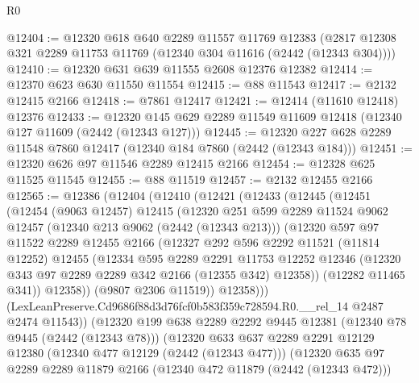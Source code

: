 \begin{lexlean}{R0}
\begin{coremodule}
@12404 := @12320
    @618
    @640
    @2289
    @11557
    @11769
    @12383
    (@2817 @12308 @321 @2289 @11753 @11769 (@12340 @304 @11616 (@2442 (@12343 @304))))
@12410 := @12320 @631 @639 @11555 @2608 @12376 @12382
@12414 := @12370 @623 @630 @11550 @11554
@12415 := @88 @11543
@12417 := @2132 @12415 @2166
@12418 := @7861 @12417
@12421 := @12414 (@11610 @12418) @12376
@12433 := @12320 @145 @629 @2289 @11549 @11609 @12418 (@12340 @127 @11609 (@2442 (@12343 @127)))
@12445 := @12320 @227 @628 @2289 @11548 @7860 @12417 (@12340 @184 @7860 (@2442 (@12343 @184)))
@12451 := @12320 @626 @97 @11546 @2289 @12415 @2166
@12454 := @12328 @625 @11525 @11545
@12455 := @88 @11519
@12457 := @2132 @12455 @2166
@12565 := @12386
    (@12404
      (@12410
        (@12421
          (@12433
            (@12445
              (@12451
                (@12454
                  (@9063 @12457)
                  @12415
                  (@12320
                    @251
                    @599
                    @2289
                    @11524
                    @9062
                    @12457
                    (@12340 @213 @9062 (@2442 (@12343 @213)))
                    (@12320
                      @597
                      @97
                      @11522
                      @2289
                      @12455
                      @2166
                      (@12327
                        @292
                        @596
                        @2292
                        @11521
                        (@11814 @12252)
                        @12455
                        (@12334
                          @595
                          @2289
                          @2291
                          @11753
                          @12252
                          @12346
                          (@12320 @343 @97 @2289 @2289 @342 @2166 (@12355 @342) @12358))
                        (@12282 @11465 @341))
                      @12358))
                  (@9807 @2306 @11519))
                @12358)))
          (LexLeanPreserve.Cd9686f88d3d76fcf0b583f359c728594.R0.__rel_14 @2487 @2474 @11543))
        (@12320
          @199
          @638
          @2289
          @2292
          @9445
          @12381
          (@12340 @78 @9445 (@2442 (@12343 @78)))
          (@12320
            @633
            @637
            @2289
            @2291
            @12129
            @12380
            (@12340 @477 @12129 (@2442 (@12343 @477)))
            (@12320
              @635
              @97
              @2289
              @2289
              @11879
              @2166
              (@12340 @472 @11879 (@2442 (@12343 @472)))

\end{coremodule}
\end{lexlean}
